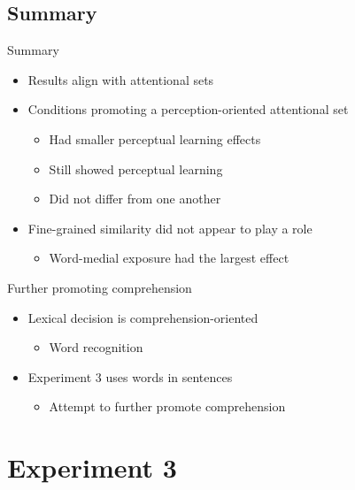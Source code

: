 \documentclass{beamer}
\begin{document}
\subsection{Summary}

\begin{frame}{Summary}

\begin{itemize}
\item Results align with attentional sets
\item Conditions promoting a perception-oriented attentional set
\begin{itemize}
\item Had smaller perceptual learning effects
\item Still showed perceptual learning
\item Did not differ from one another
\end{itemize}
\item Fine-grained similarity did not appear to play a role
\begin{itemize}
\item Word-medial exposure had the largest effect

\end{itemize}
\end{itemize}

\end{frame}

\begin{frame}{Further promoting comprehension}

\begin{itemize}

\item Lexical decision is comprehension-oriented
\begin{itemize}
\item Word recognition
\end{itemize}
\item Experiment 3 uses words in sentences
\begin{itemize}
\item Attempt to further promote comprehension
\end{itemize}
\end{itemize}

\end{frame}

\section{Experiment 3}
\end{document}
